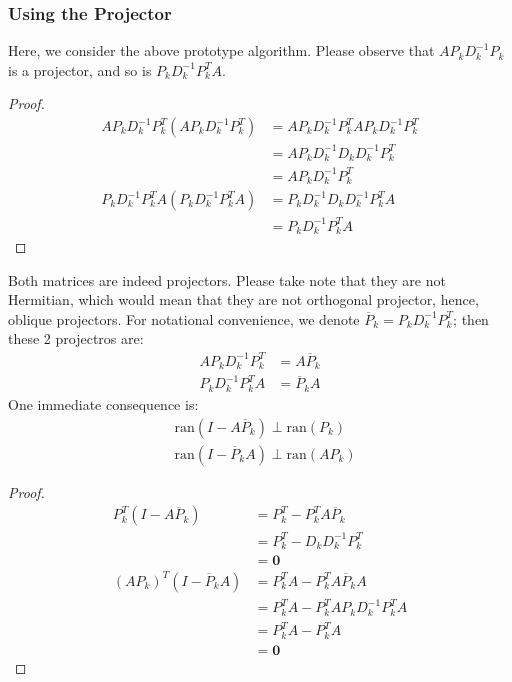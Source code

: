 \documentclass[]{article}
\theoremstyle{definition}
\begin{document}
        \subsubsection{Using the Projector}
            Here, we consider the above prototype algorithm. Please observe that $AP_kD_k^{-1}P_k$ is a projector, and so is $P_kD^{-1}_kP_k^TA$. 
            \begin{proof}
                \begin{align}
                    AP_kD^{-1}_kP_k^T(AP_kD^{-1}_kP_k^T) &= AP_kD^{-1}_kP_k^TAP_kD^{-1}_kP_k^T 
                    \\
                    &= AP_kD_k^{-1}D_kD_k^{-1}P_k^{T}
                    \\
                    &= AP_kD_k^{-1}P_k^T 
                    \\[1.1em]
                    P_kD^{-1}_kP_k^{T}A(P_kD^{-1}_kP_k^{T}A) &= P_kD^{-1}_kD_kD_{k}^{-1}P^T_kA
                    \\
                    &= 
                    P_kD^{-1}_kP^T_kA
                \end{align}
            \end{proof}
            \noindent
            Both matrices are indeed projectors. Please take note that they are not Hermitian, which would mean that they are not orthogonal projector, hence, oblique projectors. For notational convenience, we denote $\overline{P}_k = P_kD_k^{-1}P_k^{T}$; then these 2 projectros are: 
            \begin{align}
                AP_kD^{-1}_kP_k^T &= A\overline{P}_k 
                \\
                P_kD^{-1}_kP_k^TA &= \overline{P}_kA
            \end{align}
            One immediate consequence is: 
            \begin{align}
                & \text{ran}(I - A\overline{P}_k )\perp \text{ran}(P_k)
                \\
                & \text{ran}(I - \overline{P}_kA) \perp \text{ran}(AP_k)
            \end{align}
            \begin{proof}
                \begin{align}
                    P_k^T(I - A\overline{P}_k) &= P_k^T - P_k^{T}A\overline{P}_k
                    \\
                    &= P_k^{T} - D_kD_k^{-1}P^T_k
                    \\
                    &= \mathbf{0}
                    \\
                    (AP_k)^T(I - \overline{P}_kA) &=P_k^TA - P_k^TA\overline{P}_kA
                    \\
                    &= P_k^TA - P_k^TAP_kD_k^{-1}P_k^TA
                    \\
                    &= P_k^TA - P^T_kA 
                    \\
                    &= \mathbf{0}
                \end{align}
            \end{proof}
\end{document}
